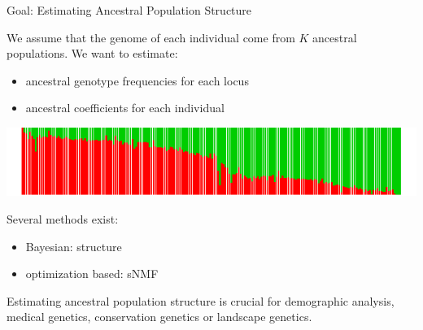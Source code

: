 \documentclass{beamer}\usepackage[]{graphicx}\usepackage[]{color}
\begin{document}
\begin{frame}{Goal: Estimating Ancestral Population Structure}

We assume that the genome of each individual come from $K$ ancestral populations. 
We want to estimate: 
\begin{itemize}
  \item \alert{ancestral genotype frequencies} for each locus
  \item \alert{ancestral coefficients} for each individual
\end{itemize}


\includegraphics{barplot.pdf}


Several methods exist:
\begin{itemize}
  \item \alert{Bayesian}: structure~\citep{pritchard2000inference}
  \item \alert{optimization based}: sNMF~\citep{frichot2014fast}
\end{itemize}
Estimating ancestral population structure is crucial for demographic analysis, medical genetics, 
  conservation genetics or landscape genetics.
\end{frame}
\end{document}

